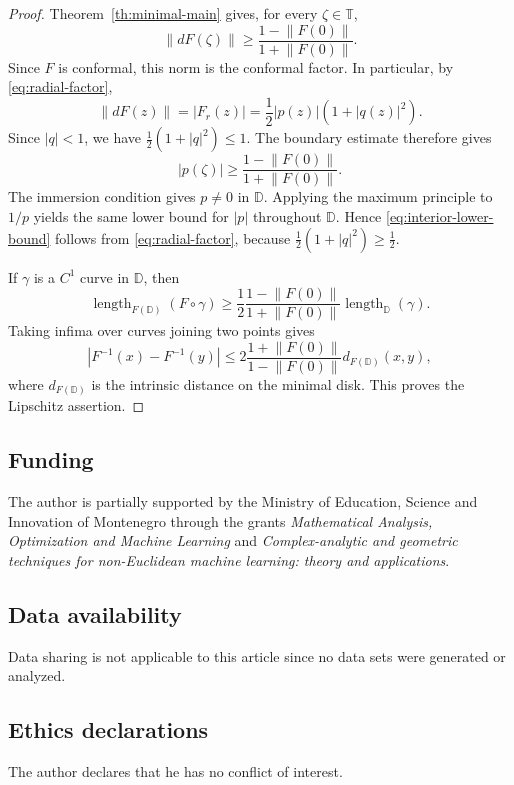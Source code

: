 \documentclass[11pt]{amsart}
\theoremstyle{definition}
\theoremstyle{remark}
\newcommand{\D}{\mathbb D}
\newcommand{\T}{\mathbb T}
\newcommand{\norm}[1]{\left\|#1\right\|}
\begin{document}
\begin{proof}
Theorem~\ref{th:minimal-main} gives, for every \(\zeta\in\T\),
\[
        \norm{dF(\zeta)}
        \ge
        \frac{1-\norm{F(0)}}{1+\norm{F(0)}}.
\]
Since \(F\) is conformal, this norm is the conformal factor. In particular, by \eqref{eq:radial-factor},
\[
        \norm{dF(z)}=|F_r(z)|=\frac12 |p(z)|(1+|q(z)|^2).
\]
Since \(|q|<1\), we have \(\frac12(1+|q|^2)\le1\). The boundary estimate therefore gives
\[
        |p(\zeta)|
        \ge
        \frac{1-\norm{F(0)}}{1+\norm{F(0)}}.
\]
The immersion condition gives \(p\ne0\) in \(\D\). Applying the maximum principle to \(1/p\) yields the same lower bound for \(|p|\) throughout \(\D\). Hence \eqref{eq:interior-lower-bound} follows from \eqref{eq:radial-factor}, because \(\frac12(1+|q|^2)\ge\frac12\).

If \(\gamma\) is a \(C^1\) curve in \(\D\), then
\[
        \operatorname{length}_{F(\D)}(F\circ\gamma)
        \ge
        \frac12\frac{1-\norm{F(0)}}{1+\norm{F(0)}}
        \operatorname{length}_{\D}(\gamma).
\]
Taking infima over curves joining two points gives
\[
        |F^{-1}(x)-F^{-1}(y)|
        \le
        2\frac{1+\norm{F(0)}}{1-\norm{F(0)}}
        d_{F(\D)}(x,y),
\]
where \(d_{F(\D)}\) is the intrinsic distance on the minimal disk. This proves the Lipschitz assertion.
\end{proof}

\subsection*{Funding}
The author is partially supported by the Ministry of Education, Science and Innovation of Montenegro through the grants \emph{Mathematical Analysis, Optimization and Machine Learning} and \emph{Complex-analytic and geometric techniques for non-Euclidean machine learning: theory and applications}.

\subsection*{Data availability}
Data sharing is not applicable to this article since no data sets were generated or analyzed.

\subsection*{Ethics declarations}
The author declares that he has no conflict of interest.
\end{document}
